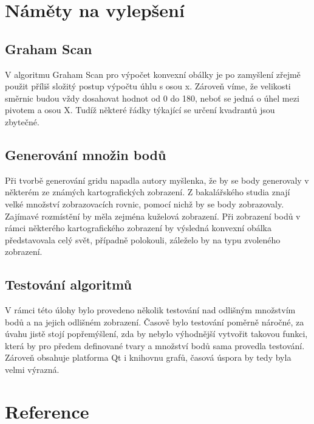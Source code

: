 \documentclass[a4paper, 12pt]{article}
\begin{document}
\section{Náměty na vylepšení}
\subsection{Graham Scan}
V algoritmu Graham Scan pro výpočet konvexní obálky je po zamyšlení zřejmě použit příliš složitý postup výpočtu úhlu s osou x. Zároveň víme, že velikosti směrnic budou vždy dosahovat hodnot od 0 do 180, neboť se jedná o úhel mezi pivotem a osou X. Tudíž některé řádky týkající se určení kvadrantů jsou zbytečné.

\subsection{Generování množin bodů}
Při tvorbě generování gridu napadla autory myšlenka, že by se body generovaly v některém ze známých kartografických zobrazení. Z bakalářského studia znají velké množství zobrazovacích rovnic, pomocí nichž by se body zobrazovaly. Zajímavé rozmístění by měla zejména kuželová zobrazení. Při zobrazení bodů v rámci některého kartografického zobrazení by výsledná konvexní obálka představovala celý svět, případně polokouli, záleželo by na typu zvoleného zobrazení.

\subsection{Testování algoritmů}
V rámci této úlohy bylo provedeno několik testování nad odlišným množstvím bodů a na jejich odlišném zobrazení. Časově bylo testování poměrně náročné, za úvahu jistě stojí popřemýšlení, zda by nebylo výhodnější vytvořit takovou funkci, která by pro předem definované tvary a množství bodů sama provedla testování. Zároveň obsahuje platforma Qt i knihovnu grafů, časová úspora by tedy byla velmi výrazná.



\clearpage
\section{Reference}
\end{document}
